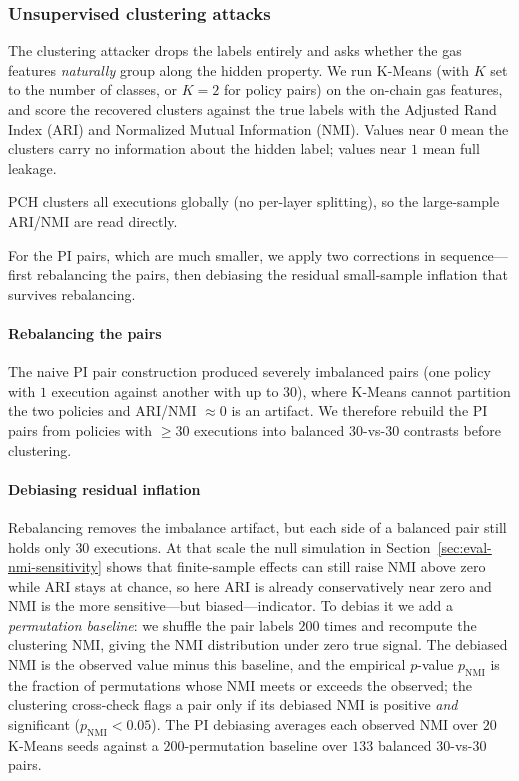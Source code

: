 \subsubsection{Unsupervised clustering attacks}
The clustering attacker drops the labels entirely and asks whether the gas features \emph{naturally} group along the hidden property.
We run K-Means (with $K$ set to the number of classes, or $K{=}2$ for policy pairs) on the on-chain gas features, and score the recovered clusters against the true labels with the Adjusted Rand Index (ARI) and Normalized Mutual Information (NMI). 
Values near $0$ mean the clusters carry no information about the hidden label; values near $1$ mean full leakage.

PCH clusters all executions globally (no per-layer splitting), so the large-sample ARI/NMI are read directly. 

For the PI pairs, which are much smaller, we apply two corrections in sequence---first rebalancing the pairs, then debiasing the residual small-sample inflation that survives rebalancing.
\paragraph{Rebalancing the pairs} The naive PI pair construction produced severely imbalanced pairs (one policy with $1$ execution against another with up to $30$), where K-Means cannot partition the two policies and ARI/NMI $\approx 0$ is an artifact. We therefore rebuild the PI pairs from policies with $\ge 30$ executions into balanced $30$-vs-$30$ contrasts before clustering.
\paragraph{Debiasing residual inflation} Rebalancing removes the imbalance artifact, but each side of a balanced pair still holds only $30$ executions. At that scale the null simulation in Section~\ref{sec:eval-nmi-sensitivity} shows that finite-sample effects can still raise NMI above zero while ARI stays at chance, so here ARI is already conservatively near zero and NMI is the more sensitive---but biased---indicator. To debias it we add a \emph{permutation baseline}: we shuffle the pair labels $200$ times and recompute the clustering NMI, giving the NMI distribution under zero true signal.
The debiased NMI is the observed value minus this baseline, and the empirical $p$-value $p_{\mathrm{NMI}}$ is the fraction of permutations whose NMI meets or exceeds the observed; the clustering cross-check flags a pair only if its debiased NMI is positive \emph{and} significant ($p_{\mathrm{NMI}}<0.05$).
The PI debiasing averages each observed NMI over $20$ K-Means seeds against a $200$-permutation baseline over $133$ balanced $30$-vs-$30$ pairs.
